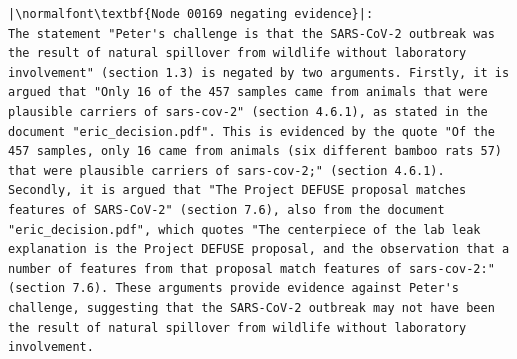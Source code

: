 \documentclass{article}
\begin{document}
\begin{lstlisting}
|\normalfont\textbf{Node 00169 negating evidence}|:
The statement "Peter's challenge is that the SARS-CoV-2 outbreak was the result of natural spillover from wildlife without laboratory involvement" (section 1.3) is negated by two arguments. Firstly, it is argued that "Only 16 of the 457 samples came from animals that were plausible carriers of sars-cov-2" (section 4.6.1), as stated in the document "eric_decision.pdf". This is evidenced by the quote "Of the 457 samples, only 16 came from animals (six different bamboo rats 57) that were plausible carriers of sars-cov-2;" (section 4.6.1). Secondly, it is argued that "The Project DEFUSE proposal matches features of SARS-CoV-2" (section 7.6), also from the document "eric_decision.pdf", which quotes "The centerpiece of the lab leak explanation is the Project DEFUSE proposal, and the observation that a number of features from that proposal match features of sars-cov-2:" (section 7.6). These arguments provide evidence against Peter's challenge, suggesting that the SARS-CoV-2 outbreak may not have been the result of natural spillover from wildlife without laboratory involvement.

    
\end{lstlisting}
\end{document}
